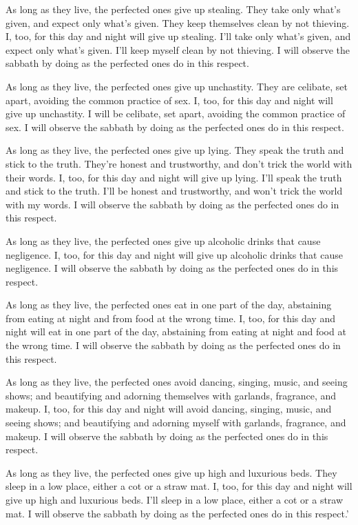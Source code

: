 \documentclass[12pt,openany]{book}%
\begin{document}
As long as they live, the perfected ones give up stealing. They take only what’s given, and expect only what’s given. They keep themselves clean by not thieving. I, too, for this day and night will give up stealing. I’ll take only what’s given, and expect only what’s given. I’ll keep myself clean by not thieving. I will observe the sabbath by doing as the perfected ones do in this respect. 

As long as they live, the perfected ones give up unchastity. They are celibate, set apart, avoiding the common practice of sex. I, too, for this day and night will give up unchastity. I will be celibate, set apart, avoiding the common practice of sex. I will observe the sabbath by doing as the perfected ones do in this respect. 

As long as they live, the perfected ones give up lying. They speak the truth and stick to the truth. They’re honest and trustworthy, and don’t trick the world with their words. I, too, for this day and night will give up lying. I’ll speak the truth and stick to the truth. I’ll be honest and trustworthy, and won’t trick the world with my words. I will observe the sabbath by doing as the perfected ones do in this respect. 

As long as they live, the perfected ones give up alcoholic drinks that cause negligence. I, too, for this day and night will give up alcoholic drinks that cause negligence. I will observe the sabbath by doing as the perfected ones do in this respect. 

As long as they live, the perfected ones eat in one part of the day, abstaining from eating at night and from food at the wrong time. I, too, for this day and night will eat in one part of the day, abstaining from eating at night and food at the wrong time. I will observe the sabbath by doing as the perfected ones do in this respect. 

As long as they live, the perfected ones avoid dancing, singing, music, and seeing shows; and beautifying and adorning themselves with garlands, fragrance, and makeup. I, too, for this day and night will avoid dancing, singing, music, and seeing shows; and beautifying and adorning myself with garlands, fragrance, and makeup. I will observe the sabbath by doing as the perfected ones do in this respect. 

As long as they live, the perfected ones give up high and luxurious beds. They sleep in a low place, either a cot or a straw mat. I, too, for this day and night will give up high and luxurious beds. I’ll sleep in a low place, either a cot or a straw mat. I will observe the sabbath by doing as the perfected ones do in this respect.’ 
\end{document}
